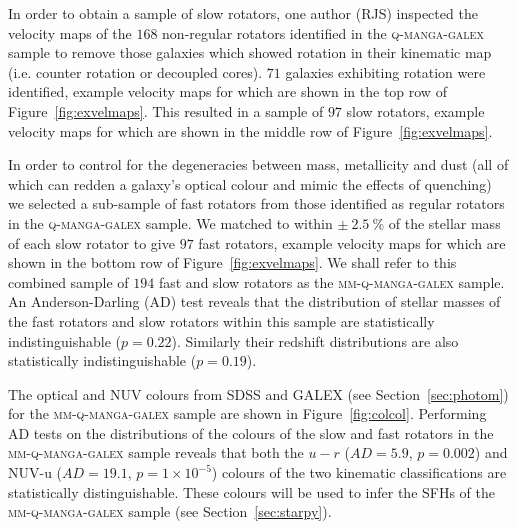 \documentclass[useAMS,usenatbib]{mn2e}
\begin{document}
In order to obtain a sample of slow rotators, one author (RJS) inspected the velocity maps of the $168$ non-regular rotators identified in the \textsc{q-manga-galex} sample to remove those galaxies which showed rotation in their kinematic map (i.e. counter rotation or decoupled cores). $71$ galaxies exhibiting rotation were identified, example velocity maps for which are shown in the top row of Figure~\ref{fig:exvelmaps}. This resulted in a sample of $97$ slow rotators, example velocity maps for which are shown in the middle row of Figure~\ref{fig:exvelmaps}.  

In order to control for the degeneracies between mass, metallicity and dust (all of which can redden a galaxy's optical colour and mimic the effects of quenching) we selected a sub-sample of fast rotators from those identified as regular rotators in the \textsc{q-manga-galex} sample. We matched to within $\pm~2.5~\%$ of the stellar mass of each slow rotator to give $97$ fast rotators, example velocity maps for which are shown in the bottom row of Figure~\ref{fig:exvelmaps}. We shall refer to this combined sample of $194$ fast and slow rotators as the \textsc{mm-q-manga-galex} sample. An Anderson-Darling (AD) test reveals that the distribution of stellar masses of the fast rotators and slow rotators within this sample are statistically indistinguishable ($p=0.22$). Similarly their redshift distributions are also statistically indistinguishable ($p=0.19$).

The optical and NUV colours from SDSS and GALEX (see Section~\ref{sec:photom}) for the \textsc{mm-q-manga-galex} sample are shown in Figure~\ref{fig:colcol}. Performing AD tests on the distributions of the colours of the slow and fast rotators in the \textsc{mm-q-manga-galex} sample reveals that both the $u-r$ ($AD= 5.9$, $p = 0.002$) and NUV-u ($AD= 19.1$, $p = 1\times10^{-5}$) colours of the two kinematic classifications are statistically distinguishable. These colours will be used to infer the SFHs of the \textsc{mm-q-manga-galex} sample (see Section~\ref{sec:starpy}).
\end{document}
